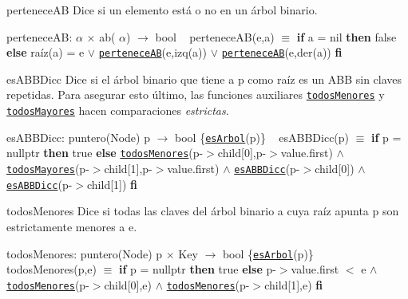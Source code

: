 \begin{DoxyParagraph}{pertenece\+AB}
Dice si un elemento está o no en un árbol binario.

pertenece\+AB\+:  $\alpha$ $\times$ ab( $\alpha$) $\to$ bool ~\newline
 pertenece\+A\+B(e,a) $\equiv$ {\bfseries if} a = nil {\bfseries then} false {\bfseries else} raíz(a) = e $\lor$ \href{axiomas.html#perteneceAB}{\tt pertenece\+AB}(e,izq(a)) $\lor$ \href{axiomas.html#perteneceAB}{\tt pertenece\+AB}(e,der(a)) {\bfseries fi} 


\end{DoxyParagraph}
\begin{DoxyParagraph}{es\+A\+B\+B\+Dicc}
Dice si el árbol binario que tiene a p como raíz es un A\+BB sin claves repetidas. Para asegurar esto último, las funciones auxiliares \href{axiomas.html#todosMenores}{\tt todos\+Menores} y \href{axiomas.html#todosMayores}{\tt todos\+Mayores} hacen comparaciones {\itshape estrictas}.

es\+A\+B\+B\+Dicc\+: puntero(\+Node) p $\to$ bool \{\href{axiomas.html#esArbol}{\tt es\+Arbol}(p)\} ~\newline
 es\+A\+B\+B\+Dicc(p) $\equiv$ {\bfseries if} p = nullptr {\bfseries then} true {\bfseries else} \href{axiomas.html#todosMenores}{\tt todos\+Menores}(p-\/$>$child\mbox{[}0\mbox{]},p-\/$>$value.\+first) $\land$ \href{axiomas.html#todosMayores}{\tt todos\+Mayores}(p-\/$>$child\mbox{[}1\mbox{]},p-\/$>$value.\+first) $\land$ \href{axiomas.html#esABBDicc}{\tt es\+A\+B\+B\+Dicc}(p-\/$>$child\mbox{[}0\mbox{]}) $\land$ \href{axiomas.html#esABBDicc}{\tt es\+A\+B\+B\+Dicc}(p-\/$>$child\mbox{[}1\mbox{]}) {\bfseries fi} 


\end{DoxyParagraph}
\begin{DoxyParagraph}{todos\+Menores}
Dice si todas las claves del árbol binario a cuya raíz apunta p son estrictamente menores a e.

todos\+Menores\+: puntero(\+Node) p $\times$ Key $\to$ bool \{\href{axiomas.html#esArbol}{\tt es\+Arbol}(p)\} ~\newline
 todos\+Menores(p,e) $\equiv$ {\bfseries if} p = nullptr {\bfseries then} true {\bfseries else} p-\/$>$value.\+first $<$ e $\land$ \href{axiomas.html#todosMenores}{\tt todos\+Menores}(p-\/$>$child\mbox{[}0\mbox{]},e) $\land$ \href{axiomas.html#todosMenores}{\tt todos\+Menores}(p-\/$>$child\mbox{[}1\mbox{]},e) {\bfseries fi} 


\end{DoxyParagraph}
